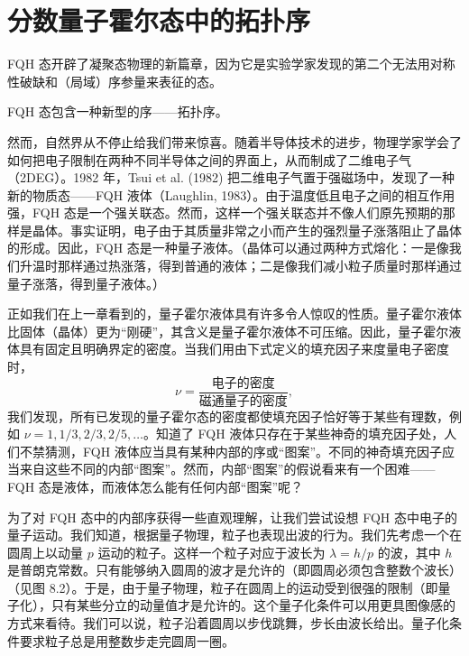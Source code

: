 \section{分数量子霍尔态中的拓扑序}

\begin{keypoints}
\item FQH 态开辟了凝聚态物理的新篇章，因为它是实验学家发现的第二个无法用对称性破缺和（局域）序参量来表征的态。
\item FQH 态包含一种新型的序——拓扑序。
\end{keypoints}

然而，自然界从不停止给我们带来惊喜。随着半导体技术的进步，物理学家学会了如何把电子限制在两种不同半导体之间的界面上，从而制成了二维电子气（2DEG）。1982 年，Tsui et al. (1982) 把二维电子气置于强磁场中，发现了一种新的物质态——FQH 液体（Laughlin, 1983）。由于温度低且电子之间的相互作用强，FQH 态是一个强关联态。然而，这样一个强关联态并不像人们原先预期的那样是晶体。事实证明，电子由于其质量非常之小而产生的强烈量子涨落阻止了晶体的形成。因此，FQH 态是一种量子液体。（晶体可以通过两种方式熔化：一是像我们升温时那样通过热涨落，得到普通的液体；二是像我们减小粒子质量时那样通过量子涨落，得到量子液体。）

正如我们在上一章看到的，量子霍尔液体具有许多令人惊叹的性质。量子霍尔液体比固体（晶体）更为“刚硬”，其含义是量子霍尔液体不可压缩。因此，量子霍尔液体具有固定且明确界定的密度。当我们用由下式定义的填充因子来度量电子密度时，
\begin{equation*}
\nu = \frac{\text{电子的密度}}{\text{磁通量子的密度}},
\end{equation*}
我们发现，所有已发现的量子霍尔态的密度都使填充因子恰好等于某些有理数，例如 $\nu = 1,\allowbreak 1/3,\allowbreak 2/3,\allowbreak 2/5,\allowbreak \ldots$。知道了 FQH 液体只存在于某些神奇的填充因子处，人们不禁猜测，FQH 液体应当具有某种内部的序或“图案”。不同的神奇填充因子应当来自这些不同的内部“图案”。然而，内部“图案”的假说看来有一个困难——FQH 态是液体，而液体怎么能有任何内部“图案”呢？


为了对 FQH 态中的内部序获得一些直观理解，让我们尝试设想 FQH 态中电子的量子运动。我们知道，根据量子物理，粒子也表现出波的行为。我们先考虑一个在圆周上以动量 $p$ 运动的粒子。这样一个粒子对应于波长为 $\lambda = h/p$ 的波，其中 $h$ 是普朗克常数。只有能够纳入圆周的波才是允许的（即圆周必须包含整数个波长）（见图 8.2）。于是，由于量子物理，粒子在圆周上的运动受到很强的限制（即量子化），只有某些分立的动量值才是允许的。这个量子化条件可以用更具图像感的方式来看待。我们可以说，粒子沿着圆周以步伐跳舞，步长由波长给出。量子化条件要求粒子总是用整数步走完圆周一圈。

